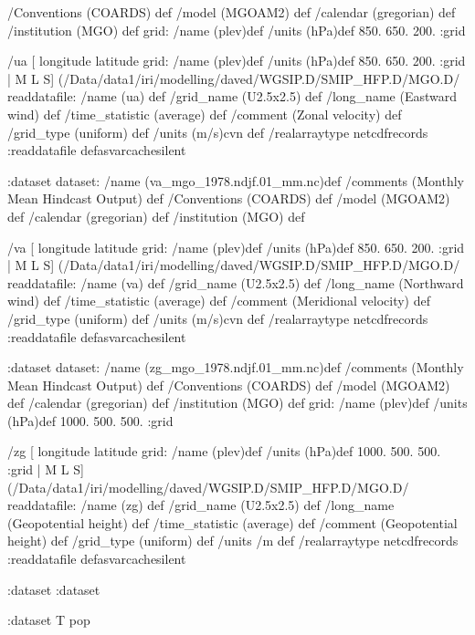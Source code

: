  /Conventions (COARDS) def
 /model (MGOAM2) def
 /calendar (gregorian) def
 /institution (MGO) def
grid:
/name (plev)def
/units (hPa)def
 850. 650. 200.
:grid
\begin{ingrid}
 /ua{
[ longitude latitude 
grid:
/name (plev)def
/units (hPa)def
 850. 650. 200.
:grid
| M L S]
(/Data/data1/iri/modelling/daved/WGSIP.D/SMIP_HFP.D/MGO.D/%
readdatafile:
/name (ua) def
 /grid_name (U2.5x2.5) def
 /long_name (Eastward wind) def
 /time_statistic (average) def
 /comment (Zonal velocity) def
 /grid_type (uniform) def
 /units (m/s)cvn def
 /realarraytype netcdfrecords :readdatafile
}defasvarcachesilent
\end{ingrid}
:dataset
dataset:
/name (va_mgo_1978.ndjf.01_mm.nc)def
 /comments (Monthly Mean Hindcast Output) def
 /Conventions (COARDS) def
 /model (MGOAM2) def
 /calendar (gregorian) def
 /institution (MGO) def
\begin{ingrid}
/va{
[ longitude latitude 
grid:
/name (plev)def
/units (hPa)def
 850. 650. 200.
:grid
| M L S]
(/Data/data1/iri/modelling/daved/WGSIP.D/SMIP_HFP.D/MGO.D/%
readdatafile:
/name (va) def
 /grid_name (U2.5x2.5) def
 /long_name (Northward wind) def
 /time_statistic (average) def
 /comment (Meridional velocity) def
 /grid_type (uniform) def
 /units (m/s)cvn def
 /realarraytype netcdfrecords :readdatafile
}defasvarcachesilent
\end{ingrid}
:dataset
dataset:
/name (zg_mgo_1978.ndjf.01_mm.nc)def
 /comments (Monthly Mean Hindcast Output) def
 /Conventions (COARDS) def
 /model (MGOAM2) def
 /calendar (gregorian) def
 /institution (MGO) def
grid:
/name (plev)def
/units (hPa)def
 1000. 500. 500.
:grid
\begin{ingrid}
 /zg{
[ longitude latitude 
grid:
/name (plev)def
/units (hPa)def
 1000. 500. 500.
:grid
| M L S]
(/Data/data1/iri/modelling/daved/WGSIP.D/SMIP_HFP.D/MGO.D/%
readdatafile:
/name (zg) def
 /grid_name (U2.5x2.5) def
 /long_name (Geopotential height) def
 /time_statistic (average) def
 /comment (Geopotential height) def
 /grid_type (uniform) def
 /units /m def
 /realarraytype netcdfrecords :readdatafile
}defasvarcachesilent
\end{ingrid}
:dataset
:dataset
\begin{ingrid}
:dataset
T pop
\end{ingrid}